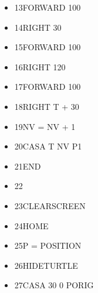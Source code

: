 \begin{minipage}{1.0\textwidth}
\begin{itemize}[itemsep=-3pt,parsep=2pt]
\item[] \hspace{0.3cm} 13\hspace{8pt}\hspace{8pt}FORWARD 100 
\item[] \hspace{0.3cm} 14\hspace{8pt}\hspace{8pt}RIGHT 30 
\item[] \hspace{0.3cm} 15\hspace{8pt}\hspace{8pt}FORWARD 100 
\item[] \hspace{0.3cm} 16\hspace{8pt}\hspace{8pt}RIGHT 120 
\item[] \hspace{0.3cm} 17\hspace{8pt}\hspace{8pt}FORWARD 100
\item[] \hspace{0.3cm} 18\hspace{8pt}\hspace{8pt}RIGHT T + 30
\item[] \hspace{0.3cm} 19\hspace{8pt}\hspace{8pt}NV = NV + 1
\item[] \hspace{0.3cm} 20\hspace{8pt}\hspace{8pt}CASA T NV P1                                   
\item[] \hspace{0.3cm} 21\hspace{8pt}END
\item[] \hspace{0.3cm} 22\hspace{8pt}
\item[] \hspace{0.3cm} 23\hspace{8pt}CLEARSCREEN   
\item[] \hspace{0.3cm} 24\hspace{8pt}HOME
\item[] \hspace{0.3cm} 25\hspace{8pt}P = POSITION
\item[] \hspace{0.3cm} 26\hspace{8pt}HIDETURTLE
\item[] \hspace{0.3cm} 27\hspace{8pt}CASA 30 0 PORIG  
\end{itemize}          	          
\end{minipage}

